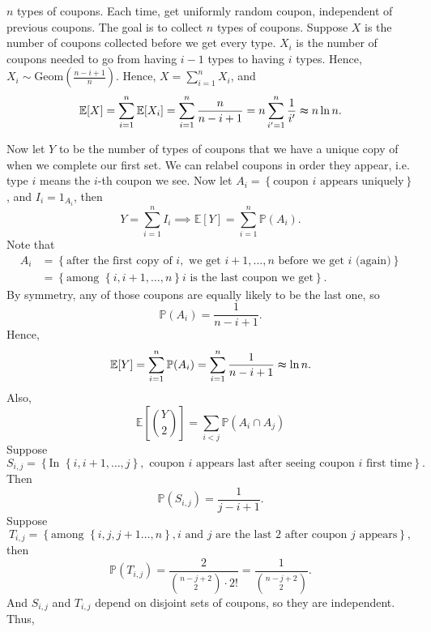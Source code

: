 \begin{eg}
    \(n\) types of coupons. Each time, get uniformly random coupon, independent of previous coupons. The goal is to collect \(n\) types of coupons. Suppose \(X\) is the number of coupons collected before we get every type. \(X_i\) is the number of coupons needed to go from having \(i - 1\) types to having \(i\) types. Hence, \(X_i \sim \mathrm{Geom} \left( \frac{n - i + 1}{n} \right) \). Hence, \(X = \sum_{i=1}^n X_i \), and 
    \[
        \mathbb{E} [X] = \sum_{i=1}^n \mathbb{E} [X_i] = \sum_{i=1}^n \frac{n}{n - i + 1} = n \sum_{i^{\prime} = 1}^n \frac{1}{i^{\prime} } \thickapprox n \ln n.  
    \]

    Now let \(Y\) to be the number of types of coupons that we have a unique copy of when we complete our first set. We can relabel coupons in order they appear, i.e. type \(i\) means the \(i\)-th coupon we see. Now let \(A_i = \left\{ \text{coupon } i \text{ appears uniquely}   \right\} \), and \(I_i = 1_{A_i}\), then 
    \[
        Y = \sum_{i=1}^n I_i \implies \mathbb{E} [Y] = \sum_{i=1}^n \mathbb{P} (A_i).  
    \]            
    Note that 
    \begin{align*}
        A_i &= \left\{ \text{after the first copy of } i, \text{ we get } i+1, \dots , n \text{ before we get } i \text{ (again)}     \right\} \\
        &= \left\{ \text{among } \left\{ i, i+1, \dots , n \right\} i \text{ is the last coupon we get}    \right\}. 
    \end{align*}
    By symmetry, any of those coupons are equally likely to be the last one, so 
    \[
        \mathbb{P} (A_i) = \frac{1}{n - i + 1}.
    \]
    Hence,
    \[
        \mathbb{E} [Y] = \sum_{i=1}^n \mathbb{P} (A_i) = \sum_{i=1}^n \frac{1}{n - i + 1} \thickapprox \ln n.  
    \]
    Also, 
    \[
        \mathbb{E} \left[ \binom{Y}{2} \right] = \sum_{i < j} \mathbb{P} (A_i \cap A_j)  
    \]
    Suppose 
    \[
        S_{i, j} = \left\{ \text{In } \left\{ i, i+1, \dots , j \right\}, \text{ coupon } i \text{ appears last after seeing coupon } i \text{ first time}      \right\}.
    \]
    Then 
    \[
        \mathbb{P} (S_{i, j}) = \frac{1}{j - i + 1}.
    \]
    Suppose 
    \[
        T_{i, j} = \left\{ \text{among } \left\{ i, j, j+1 \dots, n  \right\}, i \text{ and } j \text{ are the last 2 after coupon } j \text{ appears}      \right\}, 
    \]
    then 
    \[
        \mathbb{P} (T_{i, j}) = \frac{2}{\binom{n - j + 2}{2} \cdot 2!} = \frac{1}{\binom{n - j + 2}{2}}.
    \]
    And \(S_{i, j}\) and \(T_{i, j}\) depend on disjoint sets of coupons, so they are independent. Thus,

\end{eg}

